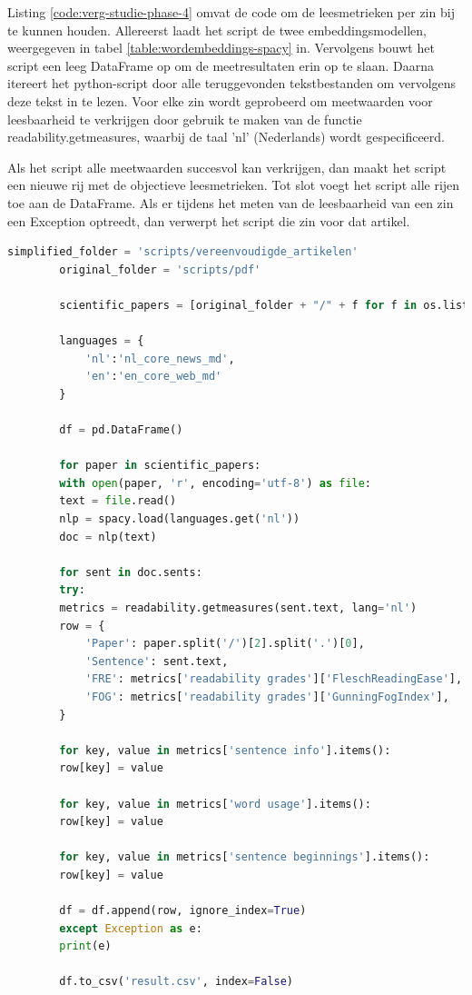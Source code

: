 \medspace

Listing \ref{code:verg-studie-phase-4} omvat de code om de leesmetrieken per zin bij te kunnen houden. Allereerst laadt het script de twee embeddingsmodellen, weergegeven in tabel \ref{table:wordembeddings-spacy} in. Vervolgens bouwt het script een leeg DataFrame op om de meetresultaten erin op te slaan. Daarna itereert het python-script door alle teruggevonden tekstbestanden om vervolgens deze tekst in te lezen. Voor elke zin wordt geprobeerd om meetwaarden voor leesbaarheid te verkrijgen door gebruik te maken van de functie readability.getmeasures, waarbij de taal 'nl' (Nederlands) wordt gespecificeerd. 

\medspace

Als het script alle meetwaarden succesvol kan verkrijgen, dan maakt het script een nieuwe rij met de objectieve leesmetrieken. Tot slot voegt het script alle rijen toe aan de DataFrame. Als er tijdens het meten van de leesbaarheid van een zin een Exception optreedt, dan verwerpt het script die zin voor dat artikel.

\begin{center}
	\begin{lstlisting}[language=Python, caption={Script voor fase 4 van de vergelijkende studie}, label={code:verg-studie-phase-4}]	
		simplified_folder = 'scripts/vereenvoudigde_artikelen'
		original_folder = 'scripts/pdf'
		
		scientific_papers = [original_folder + "/" + f for f in os.listdir(original_folder)] + [simplified_folder + "/" + f for f in os.listdir(simplified_folder)]
		
		languages = {
			'nl':'nl_core_news_md',
			'en':'en_core_web_md'
		}
		
		df = pd.DataFrame()
		
		for paper in scientific_papers:
		with open(paper, 'r', encoding='utf-8') as file:
		text = file.read()
		nlp = spacy.load(languages.get('nl'))
		doc = nlp(text)
		
		for sent in doc.sents:
		try:
		metrics = readability.getmeasures(sent.text, lang='nl')
		row = {
			'Paper': paper.split('/')[2].split('.')[0],
			'Sentence': sent.text,
			'FRE': metrics['readability grades']['FleschReadingEase'],
			'FOG': metrics['readability grades']['GunningFogIndex'],
		}
		
		for key, value in metrics['sentence info'].items():
		row[key] = value
		
		for key, value in metrics['word usage'].items():
		row[key] = value
		
		for key, value in metrics['sentence beginnings'].items():
		row[key] = value
		
		df = df.append(row, ignore_index=True)
		except Exception as e:
		print(e)
		
		df.to_csv('result.csv', index=False)
	\end{lstlisting}
\end{center}

